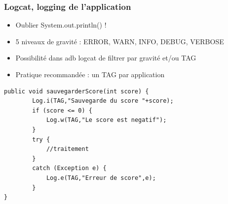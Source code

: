 \documentclass{beamer}
\begin{document}
\begin{frame}[fragile]
\frametitle{Logcat, logging de l'application}
\begin{itemize}
  \item Oublier System.out.println() !
  \item 5 niveaux de gravité : ERROR, WARN, INFO, DEBUG, VERBOSE
  \item Possibilité dans adb logcat de filtrer par gravité et/ou TAG
  \item Pratique recommandée : un TAG par application
 \end{itemize}
 \begin{lstlisting}
public void sauvegarderScore(int score) {
        Log.i(TAG,"Sauvegarde du score "+score);
        if (score <= 0) {
            Log.w(TAG,"Le score est negatif");
        }
        try {
            //traitement
        }
        catch (Exception e) {
        	Log.e(TAG,"Erreur de score",e);
        }
}
\end{lstlisting}
\end{frame}
\end{document}
